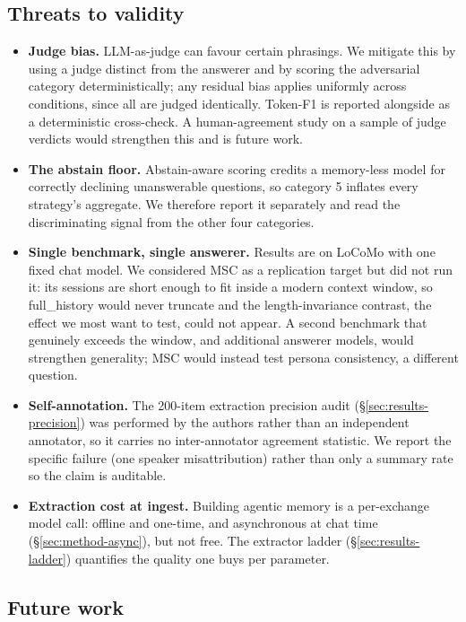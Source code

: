 \subsection{Threats to validity}
\label{sec:disc-threats}

\begin{itemize}
  \item \textbf{Judge bias.} LLM-as-judge can favour certain phrasings. We mitigate this by
  using a judge distinct from the answerer and by scoring the adversarial
  category deterministically; any residual bias applies uniformly across
  conditions, since all are judged identically. Token-F1 is reported alongside
  as a deterministic cross-check. A human-agreement study on a sample of judge
  verdicts would strengthen this and is future work.
  \item \textbf{The abstain floor.} Abstain-aware scoring credits a memory-less model for
  correctly declining unanswerable questions, so category 5 inflates every
  strategy's aggregate. We therefore report it separately and read the
  discriminating signal from the other four categories.
  \item \textbf{Single benchmark, single answerer.} Results are on LoCoMo with one fixed
  chat model. We considered MSC \citep{xu2022msc} as a replication target but did
  not run it: its sessions are short enough to fit inside a modern context
  window, so full\_history would never truncate and the length-invariance
  contrast, the effect we most want to test, could not appear. A second
  benchmark that genuinely exceeds the window, and additional answerer models,
  would strengthen generality; MSC would instead test persona consistency, a
  different question.
  \item \textbf{Self-annotation.} The 200-item extraction precision audit
  (\S\ref{sec:results-precision}) was performed by the authors rather than an
  independent annotator, so it carries no inter-annotator agreement statistic. We
  report the specific failure (one speaker misattribution) rather than only a
  summary rate so the claim is auditable.
  \item \textbf{Extraction cost at ingest.} Building agentic memory is a per-exchange model
  call: offline and one-time, and asynchronous at chat time
  (\S\ref{sec:method-async}), but not free. The extractor ladder
  (\S\ref{sec:results-ladder}) quantifies the quality one buys per parameter.
\end{itemize}

\subsection{Future work}
\label{sec:disc-future}

